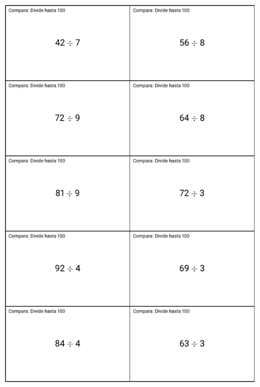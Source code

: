 \documentclass[14pt]{extarticle}
\begin{document}
\begin{image}{0}{1}{0}{}%
\includegraphics[max width=\linewidth, center]{external/blm/tikz-source/act-comparaDivideHasta100-tarjetas-grandes2.pdf}
\end{image}%
\end{document}
